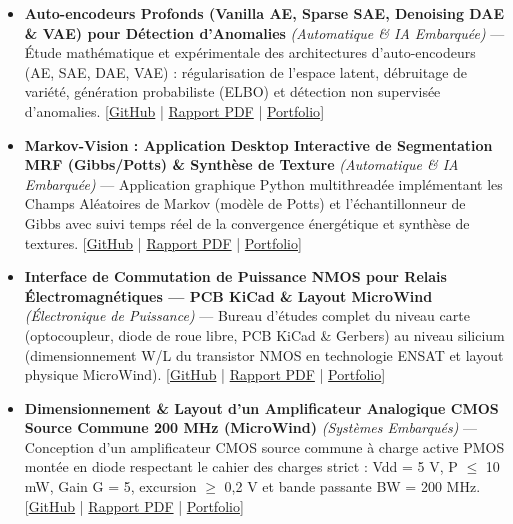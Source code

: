 \documentclass[10pt,a4paper]{article}
\begin{document}
\begin{itemize}
\item \textbf{Auto-encodeurs Profonds (Vanilla AE, Sparse SAE, Denoising DAE \& VAE) pour Détection d'Anomalies} \textit{(Automatique \& IA Embarquée)} --- Étude mathématique et expérimentale des architectures d'auto-encodeurs (AE, SAE, DAE, VAE) : régularisation de l'espace latent, débruitage de variété, génération probabiliste (ELBO) et détection non supervisée d'anomalies. [\href{https://github.com/scidelo-andriasahy/deep-autoencoders-anomaly-detection-vae}{GitHub} | \href{https://scidelo-andriasahy.github.io/assets/pdfs/Rapport_Autoencodeurs_IA.pdf}{Rapport PDF} | \href{https://scidelo-andriasahy.github.io/?project=10}{Portfolio}]
\item \textbf{Markov-Vision : Application Desktop Interactive de Segmentation MRF (Gibbs/Potts) \& Synthèse de Texture} \textit{(Automatique \& IA Embarquée)} --- Application graphique Python multithreadée implémentant les Champs Aléatoires de Markov (modèle de Potts) et l'échantillonneur de Gibbs avec suivi temps réel de la convergence énergétique et synthèse de textures. [\href{https://github.com/scidelo-andriasahy/markov-vision}{GitHub} | \href{https://scidelo-andriasahy.github.io/assets/pdfs/Rapport_Markov_Vision.pdf}{Rapport PDF} | \href{https://scidelo-andriasahy.github.io/?project=11}{Portfolio}]
\item \textbf{Interface de Commutation de Puissance NMOS pour Relais Électromagnétiques --- PCB KiCad \& Layout MicroWind} \textit{(Électronique de Puissance)} --- Bureau d'études complet du niveau carte (optocoupleur, diode de roue libre, PCB KiCad \& Gerbers) au niveau silicium (dimensionnement W/L du transistor NMOS en technologie ENSAT et layout physique MicroWind). [\href{https://github.com/scidelo-andriasahy/nmos-power-relay-driver-kicad-microwind}{GitHub} | \href{https://scidelo-andriasahy.github.io/assets/pdfs/Rapport_Interface_NMOS_Relais.pdf}{Rapport PDF} | \href{https://scidelo-andriasahy.github.io/?project=12}{Portfolio}]
\item \textbf{Dimensionnement \& Layout d'un Amplificateur Analogique CMOS Source Commune 200 MHz (MicroWind)} \textit{(Systèmes Embarqués)} --- Conception d'un amplificateur CMOS source commune à charge active PMOS montée en diode respectant le cahier des charges strict : Vdd = 5 V, P $\leq$ 10 mW, Gain G = 5, excursion $\geq$ 0,2 V et bande passante BW = 200 MHz. [\href{https://github.com/scidelo-andriasahy/cmos-common-source-amplifier-200mhz-microwind}{GitHub} | \href{https://scidelo-andriasahy.github.io/assets/pdfs/Rapport_Amplificateur_CMOS_200MHz.pdf}{Rapport PDF} | \href{https://scidelo-andriasahy.github.io/?project=13}{Portfolio}]

\end{itemize}
\end{document}
